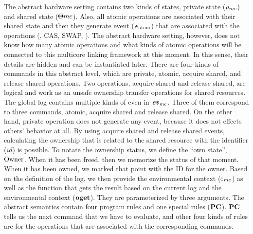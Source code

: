 The abstract hardware setting contains two kinds of states, private state (${\rho_{mc}}$) and shared state (${\Theta{mc}}$). 
Also, all atomic operations are associated with their shared state and then they generate event (${\mathrm{\textbf{\textit{e}}}_{\mathrm{atom}}}$) that 
are associated with the operations (\eg, CAS, SWAP, \etc).
The abstract hardware setting, however, 
does not know how many atomic operations and what kinds of atomic operations 
will be connected to this multicore linking framework at this moment.
In this sense, their details are hidden and can be instantiated later. 
There are four kinds of commands in this abstract level, 
which are private, atomic, acquire shared, and release shared operations. 
Two operations, acquire shared and release shared, are logical and work as an unsafe 
ownership transfer operations for shared resources. 
The global log contains multiple kinds of even in ${\mathrm{\textbf{\textit{ev}}}_{mc}}$. 
Three of them correspond to three commands, atomic, acquire shared and release shared. 
On the other hand, private operation does not generate any event, because it does not effects others' behavior at all. 
By using acquire shared and release shared events,
calculating the ownership that is related to the shared resource with the identifier ($id$) is possible. 
To notate the ownership status, we define the ``own state'', ${\mathrm{Owner}}$.
When it has been freed, then we memorize the 
status of that moment. 
When it has been owned, we marked that point with the ID for the owner. 
Based on the definition of the log, 
we then provide the environmental context (${\varepsilon_{mc}}$)
as well as the function that gets the result based on the current log and the environmental context (${\mathrm{\textbf{oget}}}$). 
They are parameterized by three arguments. 
The abstract semantics contain 
four program rules and one special rules (${\mathrm{\textbf{PC}}}$). 
${\mathrm{\textbf{PC}}}$ tells us the next command that we have to evaluate, 
and other four kinds of rules are for the operations that are associated with the corresponding commands.


